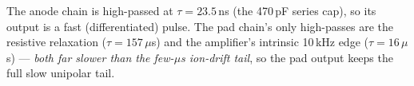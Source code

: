 \documentclass[11pt]{article}
\begin{document}
\begin{center}
\end{center}

\noindent The anode chain is high-passed at $\tau=23.5$\,ns (the 470\,pF series cap), so its
output is a fast (differentiated) pulse. The pad chain's only high-passes are the resistive
relaxation ($\tau=157\,\mu$s) and the amplifier's intrinsic 10\,kHz edge ($\tau=16\,\mu$s) —
\emph{both far slower than the few-$\mu$s ion-drift tail}, so the pad output keeps the full
slow unipolar tail.
\end{document}
